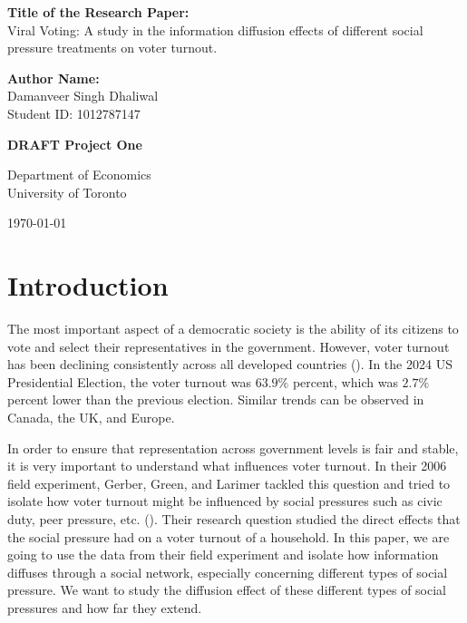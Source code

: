 \documentclass[11pt, draft]{article}
\begin{document}
\begin{titlepage}
    \centering
    \vspace*{2cm}
    
    \vspace{0.5cm}

    \Large{\textbf{Title of the Research Paper:}}\\
    Viral Voting: A study in the information diffusion effects of different social pressure treatments on voter turnout.
    
    \vspace{0.5cm}

    \Large{\textbf{Author Name:}}\\
    \Large{Damanveer Singh Dhaliwal}\\
    \Large{Student ID: 1012787147}

    \vspace{0.5cm}
    
    \Large{\textbf{DRAFT Project One}}
    
    \vfill
    
    \large{Department of Economics}\\
    \large{University of Toronto}
    
    \vspace{0.8cm}
    
    \large{\today}
    
\end{titlepage}

\section{Introduction}
The most important aspect of a democratic society is the ability of its citizens to vote and select their representatives in the government. However, voter turnout has been declining consistently across all developed countries (\cite{solijonov_voter_nodate}). In the 2024 US Presidential Election, the voter turnout was $63.9\%$ percent, which was $2.7\%$ percent lower than the previous election. Similar trends can be observed in Canada, the UK, and Europe.

In order to ensure that representation across government levels is fair and stable, it is very important to understand what influences voter turnout. In their 2006 field experiment, Gerber, Green, and Larimer tackled this question and tried to isolate how voter turnout might be influenced by social pressures such as civic duty, peer pressure, etc. (\cite{gerber_social_2008}). Their research question studied the direct effects that the social pressure had on a voter turnout of a household. In this paper, we are going to use the data from their field experiment and isolate how information diffuses through a social network, especially concerning different types of social pressure. We want to study the diffusion effect of these different types of social pressures and how far they extend. 
\end{document}
